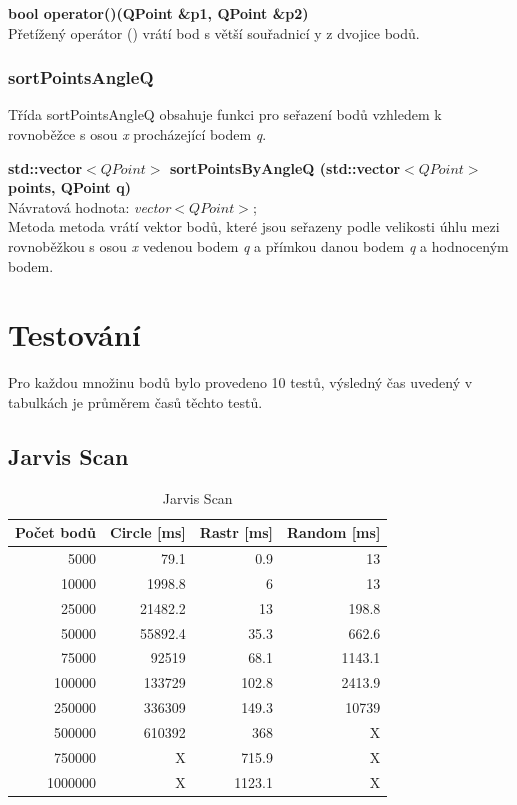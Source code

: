 \documentclass[a4paper, 12pt]{article}
\begin{document}
\textbf{bool operator()(QPoint \&p1, QPoint \&p2)}\\
Přetížený operátor () vrátí bod s větší souřadnicí y z dvojice bodů.
\\

\subsubsection{sortPointsAngleQ}
Třída sortPointsAngleQ obsahuje funkci pro seřazení bodů vzhledem k rovnoběžce s osou \textit{x} procházející bodem \textit{q}.

\textbf{std::vector$<QPoint>$ sortPointsByAngleQ (std::vector$<QPoint>$ points, QPoint q)}\\
Návratová hodnota: \textit{vector$<QPoint>$};\\
Metoda metoda vrátí vektor bodů, které jsou seřazeny podle velikosti úhlu mezi rovnoběžkou s osou \textit{x} vedenou bodem \textit{q} a přímkou danou bodem \textit{q} a hodnoceným bodem.

\newpage
\section{Testování}
Pro každou množinu bodů bylo provedeno 10 testů, výsledný čas uvedený v tabulkách je průměrem časů těchto testů.

\subsection{Jarvis Scan}

\begin{table}[h!]
	\centering
	\begin{tabular}{|r|r|r|r|}
	\hline
	 \textbf{Počet bodů} 	& \textbf{Circle [ms]} & \textbf{Rastr [ms]}  & \textbf{Random [ms]} \\ \hline
	 5000 & 79.1 & 0.9 & 13   \\ \hline
	10000 & 1998.8 & 6 & 13   \\ \hline
	25000 & 21482.2 & 13 & 198.8  \\ \hline
	50000 & 55892.4 & 35.3 & 662.6   \\ \hline
	75000 & 92519 & 68.1 & 1143.1 \\ \hline
	100000 & 133729 & 102.8 & 2413.9  \\ \hline
	250000 & 336309 & 149.3 & 10739   \\ \hline
	500000 & 610392 & 368 & X  \\ \hline
	750000 & X & 715.9 & X  \\ \hline
	1000000 & X & 1123.1 & X  \\ \hline
	
	\end{tabular}
		\caption{Jarvis Scan}
\end{table}
\end{document}
